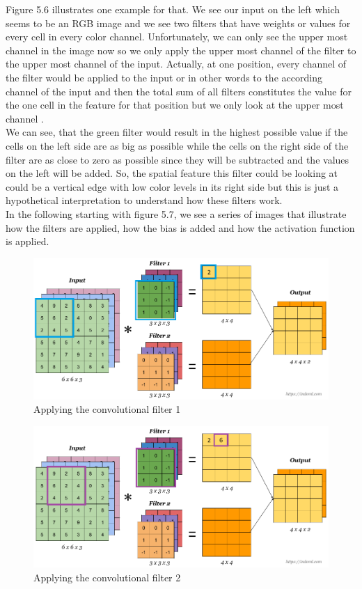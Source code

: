 \documentclass[a4paper,12pt]{report}
\begin{document}
Figure 5.6 illustrates one example for that. We see our input on the left which seems to be an RGB image and we see two filters that have weights or values for every cell in every color channel. Unfortunately, we can only see the upper most channel in the image now so we only apply the upper most channel of the filter to the upper most channel of the input. Actually, at one position, every channel of the filter would be applied to the input or in other words to the according channel of the input and then the total sum of all filters constitutes the value for the one cell in the feature for that position but we only look at the upper most channel \cite{51}.\\
	
We can see, that the green filter would result in the highest possible value if the cells on the left side are as big as possible while the cells on the right side of the filter are as close to zero as possible since they will be subtracted and the values on the left will be added. So, the spatial feature this filter could be looking at could be a vertical edge with low color levels in its right side but this is just a hypothetical interpretation to understand how these filters work.\\
	
In the following starting with figure 5.7, we see a series of images that illustrate how the filters are applied, how the bias is added and how the activation function is applied.
\begin{figure}[htbp]
  \centering
  \includegraphics[width=\textwidth]{images/CNN_filters_0.png}
  \caption{Applying the convolutional filter 1}
  \label{fig:fullwidth}
\end{figure}
	
\begin{figure}[htbp]
  \centering
  \includegraphics[width=\textwidth]{images/CNN_filters_1.png}
  \caption{Applying the convolutional filter 2}
  \label{fig:fullwidth}
\end{figure}
\end{document}
